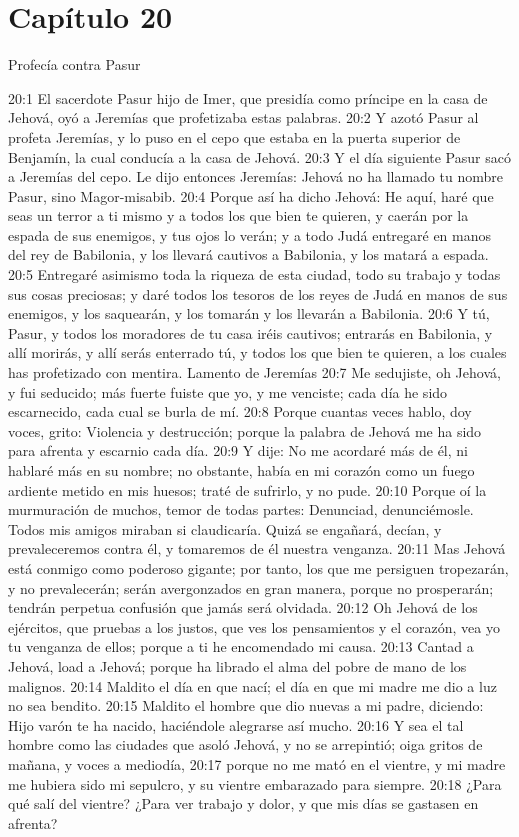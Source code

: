 \section*{Capítulo 20 }
Profecía contra Pasur 
 
20:1 El sacerdote Pasur hijo de Imer, que presidía como príncipe en la casa de Jehová, oyó a Jeremías que profetizaba estas palabras. 
20:2 Y azotó Pasur al profeta Jeremías, y lo puso en el cepo que estaba en la puerta superior de Benjamín, la cual conducía a la casa de Jehová. 
20:3 Y el día siguiente Pasur sacó a Jeremías del cepo. Le dijo entonces Jeremías: Jehová no ha llamado tu nombre Pasur, sino Magor-misabib. 
20:4 Porque así ha dicho Jehová: He aquí, haré que seas un terror a ti mismo y a todos los que bien te quieren, y caerán por la espada de sus enemigos, y tus ojos lo verán; y a todo Judá entregaré en manos del rey de Babilonia, y los llevará cautivos a Babilonia, y los matará a espada. 
20:5 Entregaré asimismo toda la riqueza de esta ciudad, todo su trabajo y todas sus cosas preciosas; y daré todos los tesoros de los reyes de Judá en manos de sus enemigos, y los saquearán, y los tomarán y los llevarán a Babilonia. 
20:6 Y tú, Pasur, y todos los moradores de tu casa iréis cautivos; entrarás en Babilonia, y allí morirás, y allí serás enterrado tú, y todos los que bien te quieren, a los cuales has profetizado con mentira. 
Lamento de Jeremías 
20:7 Me sedujiste, oh Jehová, y fui seducido; más fuerte fuiste que yo, y me venciste; cada día he sido escarnecido, cada cual se burla de mí. 
20:8 Porque cuantas veces hablo, doy voces, grito: Violencia y destrucción; porque la palabra de Jehová me ha sido para afrenta y escarnio cada día. 
20:9 Y dije: No me acordaré más de él, ni hablaré más en su nombre; no obstante, había en mi corazón como un fuego ardiente metido en mis huesos; traté de sufrirlo, y no pude. 
20:10 Porque oí la murmuración de muchos, temor de todas partes: Denunciad, denunciémosle. Todos mis amigos miraban si claudicaría. Quizá se engañará, decían, y prevaleceremos contra él, y tomaremos de él nuestra venganza. 
20:11 Mas Jehová está conmigo como poderoso gigante; por tanto, los que me persiguen tropezarán, y no prevalecerán; serán avergonzados en gran manera, porque no prosperarán; tendrán perpetua confusión que jamás será olvidada. 
20:12 Oh Jehová de los ejércitos, que pruebas a los justos, que ves los pensamientos y el corazón, vea yo tu venganza de ellos; porque a ti he encomendado mi causa. 
20:13 Cantad a Jehová, load a Jehová; porque ha librado el alma del pobre de mano de los malignos. 
20:14 Maldito el día en que nací; el día en que mi madre me dio a luz no sea bendito. 
20:15 Maldito el hombre que dio nuevas a mi padre, diciendo: Hijo varón te ha nacido, haciéndole alegrarse así mucho. 
20:16 Y sea el tal hombre como las ciudades que asoló Jehová, y no se arrepintió; oiga gritos de mañana, y voces a mediodía, 
20:17 porque no me mató en el vientre, y mi madre me hubiera sido mi sepulcro, y su vientre embarazado para siempre. 
20:18 ¿Para qué salí del vientre? ¿Para ver trabajo y dolor, y que mis días se gastasen en afrenta? 
